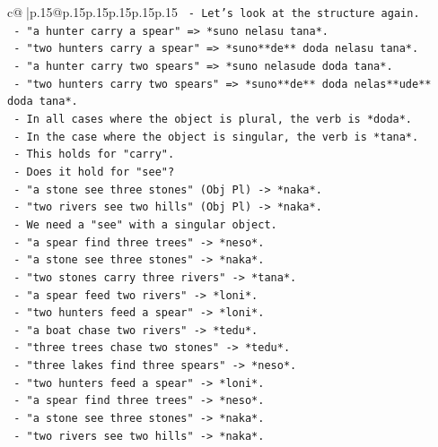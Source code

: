 \documentclass{article}
\begin{document}
{\begin{supertabular}{c@{$\;$}|p{.15\linewidth}@{}p{.15\linewidth}p{.15\linewidth}p{.15\linewidth}p{.15\linewidth}p{.15\linewidth}}
{{{\texttt{         {-} Let's look at the structure again.} \\
\texttt{         {-} "a hunter carry a spear" => *suno nelasu tana*.} \\
\texttt{         {-} "two hunters carry a spear" => *suno**de** doda nelasu tana*.} \\
\texttt{         {-} "a hunter carry two spears" => *suno nelasude doda tana*.} \\
\texttt{         {-} "two hunters carry two spears" => *suno**de** doda nelas**ude** doda tana*.} \\
\texttt{         {-} In all cases where the object is plural, the verb is *doda*.} \\
\texttt{         {-} In the case where the object is singular, the verb is *tana*.} \\
\texttt{         {-} This holds for "carry".} \\
\texttt{         {-} Does it hold for "see"?} \\
\texttt{           {-} "a stone see three stones" (Obj Pl) {-}> *naka*.} \\
\texttt{           {-} "two rivers see two hills" (Obj Pl) {-}> *naka*.} \\
\texttt{           {-} We need a "see" with a singular object.} \\
\texttt{           {-} "a spear find three trees" {-}> *neso*.} \\
\texttt{           {-} "a stone see three stones" {-}> *naka*.} \\
\texttt{           {-} "two stones carry three rivers" {-}> *tana*.} \\
\texttt{           {-} "a spear feed two rivers" {-}> *loni*.} \\
\texttt{           {-} "two hunters feed a spear" {-}> *loni*.} \\
\texttt{           {-} "a boat chase two rivers" {-}> *tedu*.} \\
\texttt{           {-} "three trees chase two stones" {-}> *tedu*.} \\
\texttt{           {-} "three lakes find three spears" {-}> *neso*.} \\
\texttt{           {-} "two hunters feed a spear" {-}> *loni*.} \\
\texttt{           {-} "a spear find three trees" {-}> *neso*.} \\
\texttt{           {-} "a stone see three stones" {-}> *naka*.} \\
\texttt{           {-} "two rivers see two hills" {-}> *naka*.} \\
}}}
\end{supertabular}}
\end{document}
